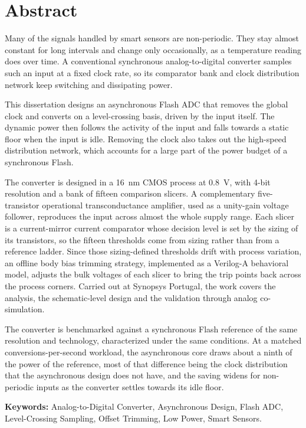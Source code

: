 \chapter*{Abstract}

Many of the signals handled by smart sensors are non-periodic. They stay almost constant for long intervals and change only occasionally, as a temperature reading does over time. A conventional synchronous analog-to-digital converter samples such an input at a fixed clock rate, so its comparator bank and clock distribution network keep switching and dissipating power.

This dissertation designs an asynchronous Flash ADC that removes the global clock and converts on a level-crossing basis, driven by the input itself. The dynamic power then follows the activity of the input and falls towards a static floor when the input is idle. Removing the clock also takes out the high-speed distribution network, which accounts for a large part of the power budget of a synchronous Flash.

The converter is designed in a 16~nm CMOS process at 0.8~V, with 4-bit resolution and a bank of fifteen comparison slicers. A complementary five-transistor operational transconductance amplifier, used as a unity-gain voltage follower, reproduces the input across almost the whole supply range. Each slicer is a current-mirror current comparator whose decision level is set by the sizing of its transistors, so the fifteen thresholds come from sizing rather than from a reference ladder. Since those sizing-defined thresholds drift with process variation, an offline body bias trimming strategy, implemented as a Verilog-A behavioral model, adjusts the bulk voltages of each slicer to bring the trip points back across the process corners. Carried out at Synopsys Portugal, the work covers the analysis, the schematic-level design and the validation through analog co-simulation.

The converter is benchmarked against a synchronous Flash reference of the same resolution and technology, characterized under the same conditions. At a matched conversions-per-second workload, the asynchronous core draws about a ninth of the power of the reference, most of that difference being the clock distribution that the asynchronous design does not have, and the saving widens for non-periodic inputs as the converter settles towards its idle floor.

\textbf{Keywords:} Analog-to-Digital Converter, Asynchronous Design, Flash ADC, Level-Crossing Sampling, Offset Trimming, Low Power, Smart Sensors.

